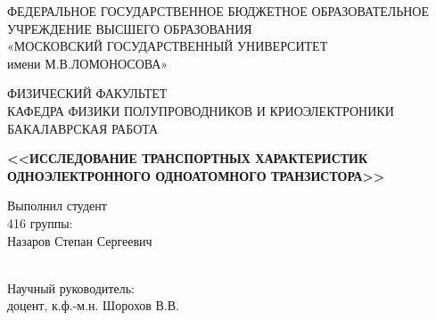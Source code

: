 \documentclass[12pt,a4paper]{report}
\begin{document}
\setlength{\parindent}{1.25cm} 
\sloppy   

\onehalfspacing   

\renewcommand{\cftchapdotsep}{\cftdotsep} 

\thispagestyle{empty}
\begin{titlepage}
\begin{center}
ФЕДЕРАЛЬНОЕ ГОСУДАРСТВЕННОЕ БЮДЖЕТНОЕ ОБРАЗОВАТЕЛЬНОЕ
УЧРЕЖДЕНИЕ ВЫСШЕГО ОБРАЗОВАНИЯ \\
«МОСКОВСКИЙ ГОСУДАРСТВЕННЫЙ УНИВЕРСИТЕТ\\
имени М.В.ЛОМОНОСОВА»
\vspace{1cm}

ФИЗИЧЕСКИЙ ФАКУЛЬТЕТ\\
\vspace{1cm}
КАФЕДРА ФИЗИКИ ПОЛУПРОВОДНИКОВ И КРИОЭЛЕКТРОНИКИ\\

\vspace{1cm}
БАКАЛАВРСКАЯ РАБОТА \\
\vspace{1cm}

\textbf{<<ИССЛЕДОВАНИЕ ТРАНСПОРТНЫХ ХАРАКТЕРИСТИК ОДНОЭЛЕКТРОННОГО ОДНОАТОМНОГО ТРАНЗИСТОРА>>}


\end{center}


\begin{flushright}
\vspace{1cm}

Выполнил студент \\
416 группы:\\

Назаров Степан Сергеевич \\

\underline{\hspace{3cm}}\\

\vspace{1cm}

Научный руководитель:\\
доцент, к.ф.\--м.н. Шорохов В.В. \\
\underline{\hspace{3cm}}\\
 

\end{flushright}
\end{titlepage}
\end{document}
